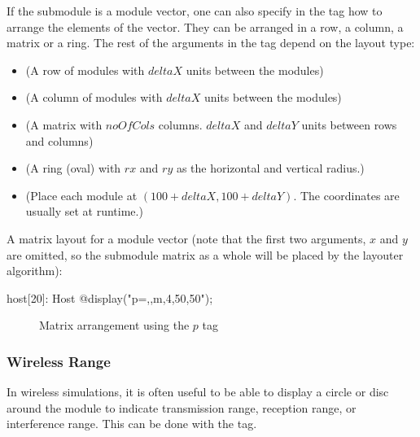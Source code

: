 If the submodule is a module vector, one can also specify in the 
tag how to arrange the elements of the vector. They can be arranged in a
row, a column, a matrix or a ring. The rest of the arguments in the 
tag depend on the layout type:

\begin{itemize}
  \item {} (A row of modules with $deltaX$ units between the modules)
  \item {} (A column of modules with $deltaX$ units between the modules)
  \item {} (A matrix with $noOfCols$ columns.
            $deltaX$ and $deltaY$ units between rows and columns)
  \item {} (A ring (oval) with $rx$ and $ry$ as the horizontal and vertical radius.)
  \item {} (Place each module at $(100+deltaX, 100+deltaY)$.
            The coordinates are usually set at runtime.)
\end{itemize}

A matrix layout for a module vector (note that the first two arguments, $x$
and $y$ are omitted, so the submodule matrix as a whole will be placed by
the layouter algorithm):

\begin{ned}
host[20]: Host {
    @display("p=,,m,4,50,50");
}
\end{ned}

\begin{figure}[htbp]
  \begin{center}
    \caption{Matrix arrangement using the $p$ tag}
    \label{fig:graphics-ptag}
  \end{center}
\end{figure}

\subsubsection{Wireless Range}
\label{sec:graphics:submodule-wireless-range}

In wireless simulations, it is often useful to be able to display a circle
or disc around the module to indicate transmission range, reception range,
or interference range. This can be done with the  tag.

